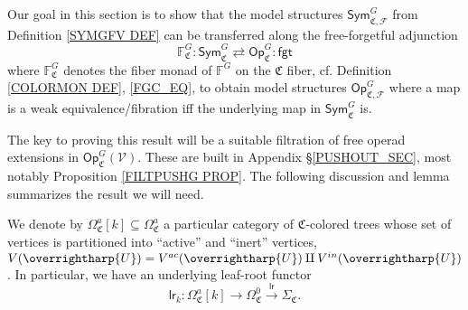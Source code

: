 \documentclass[a4paper,10pt
,draft
]{article}%
\numberwithin{equation}{section}
\numberwithin{figure}{section}
\theoremstyle{definition} %
\newcommand{\longto}{\longrightarrow}%
\newcommand{\vect}[1]{\text{\overrightharp{\ensuremath{#1}}}}
\newcommand{\F}{\ensuremath{\mathcal F}}
\newcommand{\V}{\ensuremath{\mathcal V}}
\newcommand{\1}{\ensuremath{\mathbbm 1}}%
\begin{document}
Our goal in this section is to show that the model structures 
$\mathsf{Sym}^G_{\mathfrak{C},\F}$
from Definition \ref{SYMGFV DEF} can be transferred 
along the free-forgetful adjunction
\begin{equation}\label{OPAUTADJ EQ}
\mathbb{F}^G_{\mathfrak{C}} \colon
\mathsf{Sym}^G_{\mathfrak{C}}
\rightleftarrows
\mathsf{Op}^G_{\mathfrak{C}}
\colon \mathsf{fgt}
\end{equation}
where $\mathbb{F}^G_{\mathfrak{C}}$
denotes the fiber monad of $\mathbb{F}^G$ on the $\mathfrak{C}$ fiber, cf. Definition \ref{COLORMON DEF}, \eqref{FGC_EQ},
to obtain model structures
$\mathsf{Op}^G_{\mathfrak{C},\F}$
where a map is a weak equivalence/fibration iff the underlying map in 
$\mathsf{Sym}^G_{\mathfrak{C}}$ is.

The key to proving this result will be a suitable filtration of free operad extensions in $\mathsf{Op}_{\mathfrak{C}}^G(\V)$.
These are built in Appendix \S \ref{PUSHOUT_SEC}, most notably Proposition \ref{FILTPUSHG PROP}.
The following discussion and lemma summarizes the result we will need.

We denote by $\Omega_{\mathfrak C}^a[k] \subseteq \Omega_{\mathfrak C}^a$ a particular category of
$\mathfrak C$-colored trees whose set of vertices is partitioned into ``active'' and ``inert'' vertices,
$V(\vect U) = V^{ac}(\vect U) \amalg V^{in}(\vect U)$.
In particular, we have an underlying leaf-root functor
\[
      \mathsf{lr}_k \colon
      \Omega^a_{\mathfrak{C}}[k]
      \longto
      \Omega_{\mathfrak C}^0
      \xrightarrow{\mathsf{lr}}
      \Sigma_{\mathfrak{C}}.
\]
\end{document}
